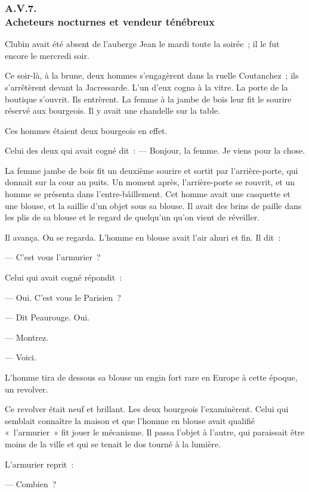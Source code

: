 \documentclass[french,twoside]{book} %
\begin{document}
 \subsubsection[{A.V.7. Acheteurs nocturnes et vendeur ténébreux}]{A.V.7. \\
Acheteurs nocturnes et vendeur ténébreux}
\noindent Clubin avait été absent de l’auberge Jean le mardi toute la soirée ; il le fut encore le mercredi soir.\par
Ce soir-là, à la brune, deux hommes s’engagèrent dans la ruelle Coutanchez ; ils s’arrêtèrent devant la Jacressarde. L’un d’eux cogna à la vitre. La porte de la boutique s’ouvrit. Ils entrèrent. La femme à la jambe de bois leur fit le sourire réservé aux bourgeois. Il y avait une chandelle sur la table.\par
Ces hommes étaient deux bourgeois en effet.\par
Celui des deux qui avait cogné dit : — Bonjour, la femme. Je viens pour la chose.\par
La femme jambe de bois fit un deuxième sourire et sortit par l’arrière-porte, qui donnait sur la cour au puits. Un moment après, l’arrière-porte se rouvrit, et un homme se présenta dans l’entre-bâillement. Cet homme avait une casquette et une blouse, et la saillie d’un objet sous sa blouse. Il avait des brins de paille dans les plis de sa blouse et le regard de quelqu’un qu’on vient de réveiller.\par
 Il avança. On se regarda. L’homme en blouse avait l’air ahuri et fin. Il dit :\par
— C’est vous l’armurier ?\par
Celui qui avait cogné répondit :\par
— Oui. C’est vous le Parisien ?\par
— Dit Peaurouge. Oui.\par
— Montrez.\par
— Voici.\par
L’homme tira de dessous sa blouse un engin fort rare en Europe à cette époque, un revolver.\par
Ce revolver était neuf et brillant. Les deux bourgeois l’examinèrent. Celui qui semblait connaître la maison et que l’homme en blouse avait qualifié « l’armurier » fit jouer le mécanisme. Il passa l’objet à l’autre, qui paraissait être moins de la ville et qui se tenait le dos tourné à la lumière.\par
L’armurier reprit :\par
— Combien ?\par
\end{document}
